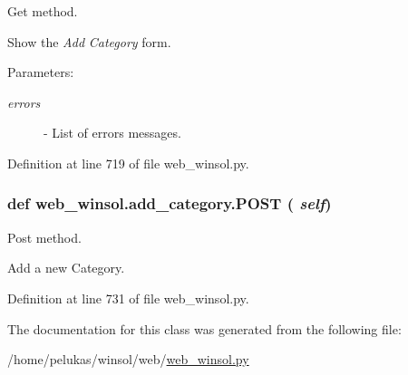 Get method. 

Show the {\em Add\/} {\em Category\/} form.

\begin{Desc}
\item[Parameters:]
\begin{description}
\item[{\em errors}]- List of errors messages. \end{description}
\end{Desc}


Definition at line 719 of file web\_\-winsol.py.\hypertarget{classweb__winsol_1_1add__category_a23cdff93b1bf1ee3e882fa6c2d1b12e}{
\subsubsection[POST]{\setlength{\rightskip}{0pt plus 5cm}def web\_\-winsol.add\_\-category.POST ( {\em self})}}
\label{classweb__winsol_1_1add__category_a23cdff93b1bf1ee3e882fa6c2d1b12e}


Post method. 

Add a new Category. 

Definition at line 731 of file web\_\-winsol.py.

The documentation for this class was generated from the following file:\begin{CompactItemize}
\item 
/home/pelukas/winsol/web/\hyperlink{web__winsol_8py}{web\_\-winsol.py}\end{CompactItemize}
